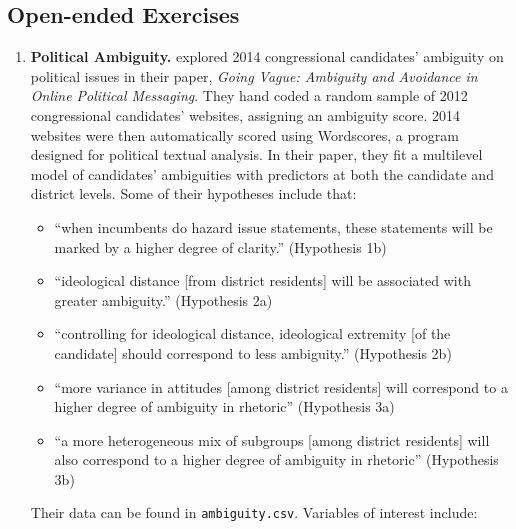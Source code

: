 \documentclass[
]{krantz}
\providecommand{\tightlist}{%
  \setlength{\itemsep}{0pt}\setlength{\parskip}{0pt}}
\begin{document}
\hypertarget{open-ended-exercises}{%
\subsection{Open-ended Exercises}\label{open-ended-exercises}}

\begin{enumerate}
\def\labelenumi{\arabic{enumi}.}
\item
  \textbf{Political Ambiguity.} \citet{Chapp2018} explored 2014 congressional candidates' ambiguity on political issues in their paper, \emph{Going Vague: Ambiguity and Avoidance in Online Political Messaging}. They hand coded a random sample of 2012 congressional candidates' websites, assigning an ambiguity score. 2014 websites were then automatically scored using Wordscores, a program designed for political textual analysis. In their paper, they fit a multilevel model of candidates' ambiguities with predictors at both the candidate and district levels. Some of their hypotheses include that:

  \begin{itemize}
  \tightlist
  \item
    ``when incumbents do hazard issue statements, these statements will be marked by a higher degree of clarity.'' (Hypothesis 1b)
  \item
    ``ideological distance {[}from district residents{]} will be associated with greater ambiguity.'' (Hypothesis 2a)
  \item
    ``controlling for ideological distance, ideological extremity {[}of the candidate{]} should correspond to less ambiguity.'' (Hypothesis 2b)
  \item
    ``more variance in attitudes {[}among district residents{]} will correspond to a higher degree of ambiguity in rhetoric'' (Hypothesis 3a)
  \item
    ``a more heterogeneous mix of subgroups {[}among district residents{]} will also correspond to a higher degree of ambiguity in rhetoric'' (Hypothesis 3b)
  \end{itemize}

  Their data can be found in \texttt{ambiguity.csv}. Variables of interest include:


\end{enumerate}
\end{document}
